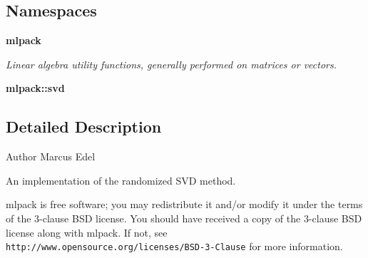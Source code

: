 \subsection*{Namespaces}
\begin{DoxyCompactItemize}
\item 
 \textbf{ mlpack}
\begin{DoxyCompactList}\small\item\em Linear algebra utility functions, generally performed on matrices or vectors. \end{DoxyCompactList}\item 
 \textbf{ mlpack\+::svd}
\end{DoxyCompactItemize}


\subsection{Detailed Description}
\begin{DoxyAuthor}{Author}
Marcus Edel
\end{DoxyAuthor}
An implementation of the randomized S\+VD method.

mlpack is free software; you may redistribute it and/or modify it under the terms of the 3-\/clause B\+SD license. You should have received a copy of the 3-\/clause B\+SD license along with mlpack. If not, see {\tt http\+://www.\+opensource.\+org/licenses/\+B\+S\+D-\/3-\/\+Clause} for more information. 